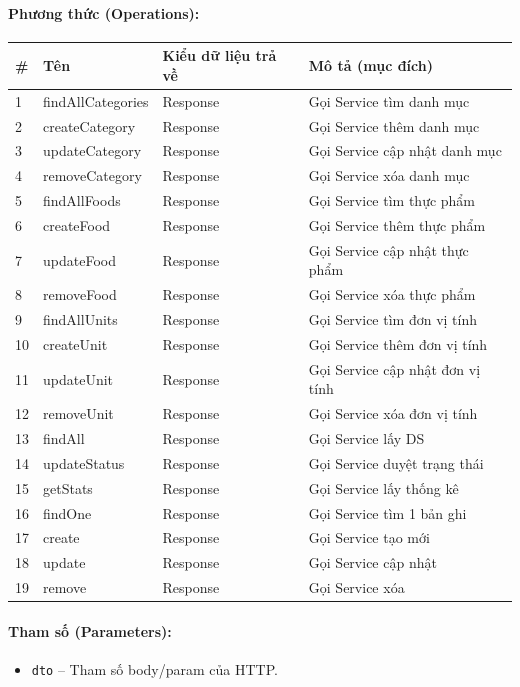 \documentclass[12pt,a4paper]{article}
\begin{document}
\paragraph{Phương thức (Operations):}
\begin{longtable}{|p{0.6cm}|p{5.0cm}|p{2.8cm}|p{5.4cm}|}
\hline
\textbf{\#} & \textbf{Tên} & \textbf{Kiểu dữ liệu trả về} & \textbf{Mô tả (mục đích)} \\ \hline
\endhead
1 & findAllCategories & Response & Gọi Service tìm danh mục \\ \hline
2 & createCategory & Response & Gọi Service thêm danh mục \\ \hline
3 & updateCategory & Response & Gọi Service cập nhật danh mục \\ \hline
4 & removeCategory & Response & Gọi Service xóa danh mục \\ \hline
5 & findAllFoods & Response & Gọi Service tìm thực phẩm \\ \hline
6 & createFood & Response & Gọi Service thêm thực phẩm \\ \hline
7 & updateFood & Response & Gọi Service cập nhật thực phẩm \\ \hline
8 & removeFood & Response & Gọi Service xóa thực phẩm \\ \hline
9 & findAllUnits & Response & Gọi Service tìm đơn vị tính \\ \hline
10 & createUnit & Response & Gọi Service thêm đơn vị tính \\ \hline
11 & updateUnit & Response & Gọi Service cập nhật đơn vị tính \\ \hline
12 & removeUnit & Response & Gọi Service xóa đơn vị tính \\ \hline
13 & findAll & Response & Gọi Service lấy DS \\ \hline
14 & updateStatus & Response & Gọi Service duyệt trạng thái \\ \hline
15 & getStats & Response & Gọi Service lấy thống kê \\ \hline
16 & findOne & Response & Gọi Service tìm 1 bản ghi \\ \hline
17 & create & Response & Gọi Service tạo mới \\ \hline
18 & update & Response & Gọi Service cập nhật \\ \hline
19 & remove & Response & Gọi Service xóa \\ \hline
\end{longtable}

\paragraph{Tham số (Parameters):}
\begin{itemize}[leftmargin=*]
    \item \texttt{dto} – Tham số body/param của HTTP.
\end{itemize}
\end{document}
